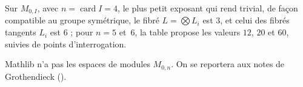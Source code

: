 \begin{encadre}
\begin{conjecture*}
Sur $M_{0,I}$, avec $n = \operatorname{card} I = 4$, le plus petit exposant qui rend trivial, de façon compatible au groupe symétrique, le fibré $L = \bigotimes L_i$ est $3$, et celui des fibrés tangents $L_i$ est $6$ ; pour $n = 5$ et~$6$, la table propose les valeurs $12$, $20$ et $60$, suivies de points d'interrogation.
\end{conjecture*}
\end{encadre}
{\small Mathlib n'a pas les espaces de modules $M_{0,n}$. On se reportera aux notes de Grothendieck ().\par}

